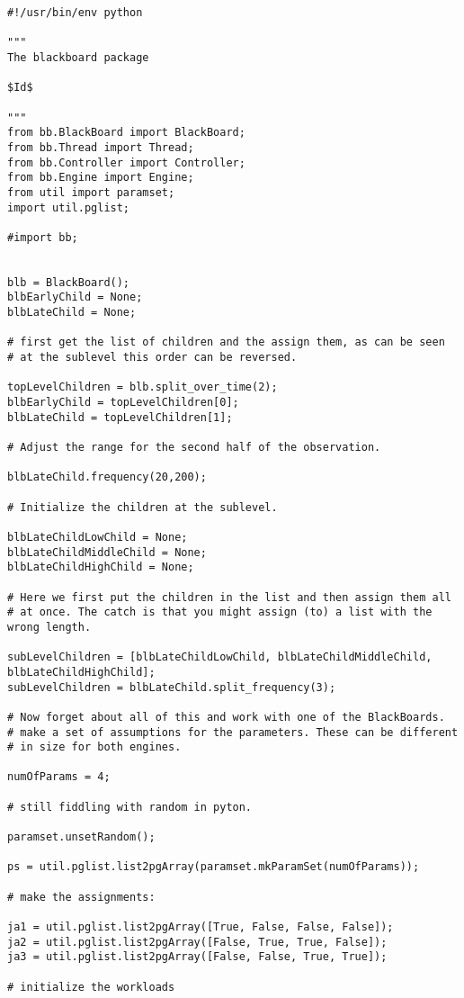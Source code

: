 \documentclass[]{lofar}
\begin{document}
  \label{app:start-script}\hypertarget{app:start-script}{}
\begin{Verbatim}[]
#!/usr/bin/env python

"""
The blackboard package

$Id$

"""
from bb.BlackBoard import BlackBoard;
from bb.Thread import Thread;
from bb.Controller import Controller;
from bb.Engine import Engine;
from util import paramset;
import util.pglist;

#import bb;


blb = BlackBoard();
blbEarlyChild = None;
blbLateChild = None;

# first get the list of children and the assign them, as can be seen
# at the sublevel this order can be reversed.

topLevelChildren = blb.split_over_time(2);
blbEarlyChild = topLevelChildren[0];
blbLateChild = topLevelChildren[1];

# Adjust the range for the second half of the observation.

blbLateChild.frequency(20,200);

# Initialize the children at the sublevel.

blbLateChildLowChild = None;
blbLateChildMiddleChild = None;
blbLateChildHighChild = None;

# Here we first put the children in the list and then assign them all
# at once. The catch is that you might assign (to) a list with the wrong length.

subLevelChildren = [blbLateChildLowChild, blbLateChildMiddleChild, blbLateChildHighChild];
subLevelChildren = blbLateChild.split_frequency(3);

# Now forget about all of this and work with one of the BlackBoards.
# make a set of assumptions for the parameters. These can be different
# in size for both engines.

numOfParams = 4;

# still fiddling with random in pyton.

paramset.unsetRandom();

ps = util.pglist.list2pgArray(paramset.mkParamSet(numOfParams));

# make the assignments:

ja1 = util.pglist.list2pgArray([True, False, False, False]);
ja2 = util.pglist.list2pgArray([False, True, True, False]);
ja3 = util.pglist.list2pgArray([False, False, True, True]);

# initialize the workloads


\end{Verbatim}
\end{document}
